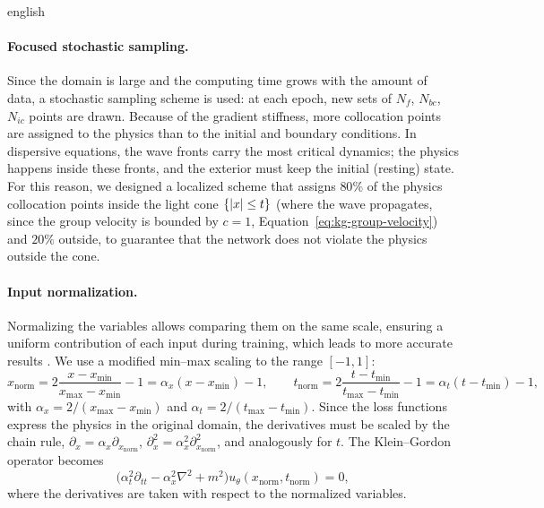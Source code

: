 \documentclass[0000.tex]{subfiles}
\begin{document}
\begin{hyphenrules}{english}
\paragraph{Focused stochastic sampling.}\label{subsec:sampling}
Since the domain is large and the computing time grows with the amount of data, a stochastic sampling
scheme is used: at each epoch, new sets of $N_f$, $N_{bc}$, $N_{ic}$ points are drawn. Because of the
gradient stiffness, more collocation points are assigned to the physics than to the initial and boundary
conditions. In dispersive equations, the wave fronts carry the most critical dynamics; the physics happens
inside these fronts, and the exterior must keep the initial (resting) state. For this reason, we designed
a localized scheme that assigns $80\%$ of the physics collocation points inside the light cone
$\{\left\lvert x \right\rvert\le t\}$ (where the wave propagates, since the group velocity is bounded by $c=1$,
Equation~\eqref{eq:kg-group-velocity}) and $20\%$ outside, to guarantee that the network does not violate the physics
outside the cone.

\paragraph{Input normalization.}
Normalizing the variables allows comparing them on the same scale, ensuring a uniform contribution of each
input during training, which leads to more accurate results \cite{xu2025preprocessing}. We use a
modified min--max scaling to the range $[-1,1]$:
\begin{equation}
  x_{\mathrm{norm}}=2\frac{x-x_{\min}}{x_{\max}-x_{\min}}-1=\alpha_x(x-x_{\min})-1,\qquad
  t_{\mathrm{norm}}=2\frac{t-t_{\min}}{t_{\max}-t_{\min}}-1=\alpha_t(t-t_{\min})-1,
  \label{eq:normalization}
\end{equation}
with $\alpha_x=2/(x_{\max}-x_{\min})$ and $\alpha_t=2/(t_{\max}-t_{\min})$. Since the loss functions
express the physics in the original domain, the derivatives must be scaled by the chain rule,
$\partial_x=\alpha_x\partial_{x_{\mathrm{norm}}}$, $\partial_x^2=\alpha_x^2\partial^2_{x_{\mathrm{norm}}}$,
and analogously for $t$. The Klein--Gordon operator becomes
\begin{equation}
  \big(\alpha_t^2\partial_{tt}-\alpha_x^2\nabla^2+m^2\big)u_\theta(x_{\mathrm{norm}},t_{\mathrm{norm}})=0,
  \label{eq:kg-normalized}
\end{equation}
where the derivatives are taken with respect to the normalized variables.


\end{hyphenrules}
\end{document}
